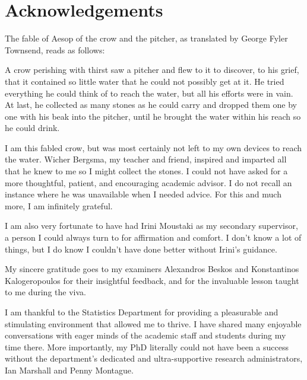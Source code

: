 \documentclass[11pt,twoside,openright,showframe]{report}
\begin{document}
\chapter*{Acknowledgements} 

The fable of Aesop of the crow and the pitcher, as translated by George Fyler Townsend, reads as follows:

\begingroup
\singlespacing
\begin{displayquote}
A crow perishing with thirst saw a pitcher and flew to it to discover, to his grief, that it contained so little water that he could not possibly get at it. 
He tried everything he could think of to reach the water, but all his efforts were in vain. 
At last, he collected as many stones as he could carry and dropped them one by one with his beak into the pitcher, until he brought the water within his reach so he could drink.
\end{displayquote}
\endgroup

I am this fabled crow, but was most certainly not left to my own devices to reach the water.
Wicher Bergsma, my teacher and friend, inspired and imparted all that he knew to me so I might collect the stones.
I could not have asked for a more thoughtful, patient, and encouraging academic advisor.
I do not recall an instance where he was unavailable when I needed  advice.
For this and much more, I am infinitely grateful.


I am also very fortunate to have had Irini Moustaki as my secondary supervisor, a person I could always turn to for affirmation and comfort.
I don't know a lot of things, but I do know I couldn't have done better without Irini's guidance.

My sincere gratitude goes to my examiners Alexandros Beskos and Konstantinos Kalogeropoulos for their insightful feedback, and for the invaluable lesson taught to me during the viva.

I am thankful to the Statistics Department for providing a pleasurable and stimulating environment that allowed me to thrive.
I have shared many enjoyable conversations with eager minds of the academic staff and students during my time there.
More importantly, my PhD literally could not have been a success without the department's dedicated and ultra-supportive research administrators, Ian Marshall and Penny Montague.
\end{document}
